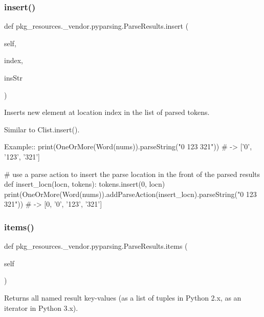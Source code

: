 \subsubsection{\texorpdfstring{insert()}{insert()}}
{\footnotesize\ttfamily def pkg\+\_\+resources.\+\_\+vendor.\+pyparsing.\+Parse\+Results.\+insert (\begin{DoxyParamCaption}\item[{}]{self,  }\item[{}]{index,  }\item[{}]{ins\+Str }\end{DoxyParamCaption})}

\begin{DoxyVerb}Inserts new element at location index in the list of parsed tokens.

Similar to C{list.insert()}.

Example::
    print(OneOrMore(Word(nums)).parseString("0 123 321")) # -> ['0', '123', '321']

    # use a parse action to insert the parse location in the front of the parsed results
    def insert_locn(locn, tokens):
tokens.insert(0, locn)
    print(OneOrMore(Word(nums)).addParseAction(insert_locn).parseString("0 123 321")) # -> [0, '0', '123', '321']
\end{DoxyVerb}
 \mbox{\label{classpkg__resources_1_1__vendor_1_1pyparsing_1_1_parse_results_aceab5058e66fab6b91ecb9c1c5044797}} 
\subsubsection{\texorpdfstring{items()}{items()}}
{\footnotesize\ttfamily def pkg\+\_\+resources.\+\_\+vendor.\+pyparsing.\+Parse\+Results.\+items (\begin{DoxyParamCaption}\item[{}]{self }\end{DoxyParamCaption})}

\begin{DoxyVerb}Returns all named result key-values (as a list of tuples in Python 2.x, as an iterator in Python 3.x).\end{DoxyVerb}
 \mbox{\label{classpkg__resources_1_1__vendor_1_1pyparsing_1_1_parse_results_adce91baa521007960c328ffa639d5974}} 
